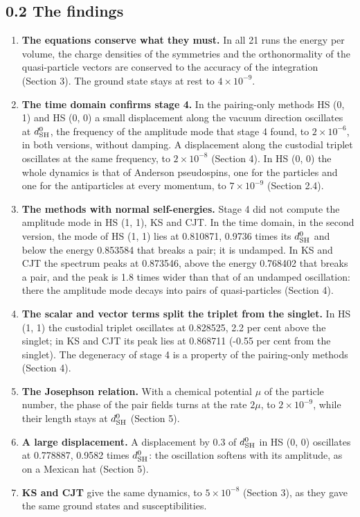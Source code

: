 \documentclass[
  10pt,
]{article}
\providecommand{\tightlist}{%
  \setlength{\itemsep}{0pt}\setlength{\parskip}{0pt}}
\begin{document}
\hypertarget{the-findings}{%
\subsection{0.2 The findings}\label{the-findings}}

\begin{enumerate}
\def\labelenumi{\arabic{enumi}.}
\tightlist
\item
  \textbf{The equations conserve what they must.} In all 21 runs the
  energy per volume, the charge densities of the symmetries and the
  orthonormality of the quasi-particle vectors are conserved to the
  accuracy of the integration (Section 3). The ground state stays at
  rest to \(4\times10^{-9}\).
\item
  \textbf{The time domain confirms stage 4.} In the pairing-only methods
  HS (0, 1) and HS (0, 0) a small displacement along the vacuum
  direction oscillates at \(d^0_{\rm SH}\), the frequency of the
  amplitude mode that stage 4 found, to \(2\times10^{-6}\), in both
  versions, without damping. A displacement along the custodial triplet
  oscillates at the same frequency, to \(2\times10^{-8}\) (Section 4).
  In HS (0, 0) the whole dynamics is that of Anderson pseudospins, one
  for the particles and one for the antiparticles at every momentum, to
  \(7\times10^{-9}\) (Section 2.4).
\item
  \textbf{The methods with normal self-energies.} Stage 4 did not
  compute the amplitude mode in HS (1, 1), KS and CJT. In the time
  domain, in the second version, the mode of HS (1, 1) lies at 0.810871,
  0.9736 times its \(d^0_{\rm SH}\) and below the energy 0.853584 that
  breaks a pair; it is undamped. In KS and CJT the spectrum peaks at
  0.873546, above the energy 0.768402 that breaks a pair, and the peak
  is 1.8 times wider than that of an undamped oscillation: there the
  amplitude mode decays into pairs of quasi-particles (Section 4).
\item
  \textbf{The scalar and vector terms split the triplet from the
  singlet.} In HS (1, 1) the custodial triplet oscillates at 0.828525,
  2.2 per cent above the singlet; in KS and CJT its peak lies at
  0.868711 (-0.55 per cent from the singlet). The degeneracy of stage 4
  is a property of the pairing-only methods (Section 4).
\item
  \textbf{The Josephson relation.} With a chemical potential \(\mu\) of
  the particle number, the phase of the pair fields turns at the rate
  \(2\mu\), to \(2\times10^{-9}\), while their length stays at
  \(d^0_{\rm SH}\) (Section 5).
\item
  \textbf{A large displacement.} A displacement by 0.3 of
  \(d^0_{\rm SH}\) in HS (0, 0) oscillates at 0.778887, 0.9582 times
  \(d^0_{\rm SH}\): the oscillation softens with its amplitude, as on a
  Mexican hat (Section 5).
\item
  \textbf{KS and CJT} give the same dynamics, to \(5\times10^{-8}\)
  (Section 3), as they gave the same ground states and susceptibilities.
\end{enumerate}
\end{document}
